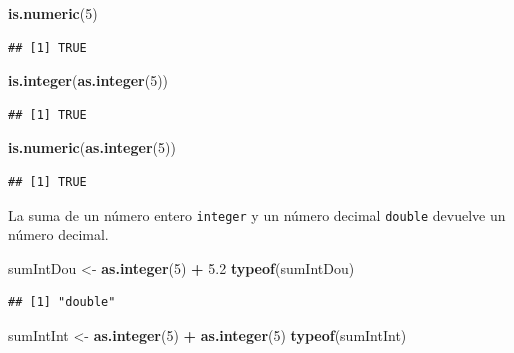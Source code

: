 \documentclass[]{book}
\newenvironment{Shaded}{\begin{snugshade}}{\end{snugshade}}
\newcommand{\KeywordTok}[1]{\textcolor[rgb]{0.13,0.29,0.53}{\textbf{#1}}}
\newcommand{\DecValTok}[1]{\textcolor[rgb]{0.00,0.00,0.81}{#1}}
\newcommand{\FloatTok}[1]{\textcolor[rgb]{0.00,0.00,0.81}{#1}}
\newcommand{\StringTok}[1]{\textcolor[rgb]{0.31,0.60,0.02}{#1}}
\newcommand{\OperatorTok}[1]{\textcolor[rgb]{0.81,0.36,0.00}{\textbf{#1}}}
\newcommand{\NormalTok}[1]{#1}
\begin{document}
\begin{Shaded}
\begin{Highlighting}[]
\KeywordTok{is.numeric}\NormalTok{(}\DecValTok{5}\NormalTok{)}
\end{Highlighting}
\end{Shaded}

\begin{verbatim}
## [1] TRUE
\end{verbatim}

\begin{Shaded}
\begin{Highlighting}[]
\KeywordTok{is.integer}\NormalTok{(}\KeywordTok{as.integer}\NormalTok{(}\DecValTok{5}\NormalTok{))}
\end{Highlighting}
\end{Shaded}

\begin{verbatim}
## [1] TRUE
\end{verbatim}

\begin{Shaded}
\begin{Highlighting}[]
\KeywordTok{is.numeric}\NormalTok{(}\KeywordTok{as.integer}\NormalTok{(}\DecValTok{5}\NormalTok{))}
\end{Highlighting}
\end{Shaded}

\begin{verbatim}
## [1] TRUE
\end{verbatim}

La suma de un número entero \texttt{integer} y un número decimal
\texttt{double} devuelve un número decimal.

\begin{Shaded}
\begin{Highlighting}[]
\NormalTok{sumIntDou <-}\StringTok{ }\KeywordTok{as.integer}\NormalTok{(}\DecValTok{5}\NormalTok{) }\OperatorTok{+}\StringTok{ }\FloatTok{5.2}
\KeywordTok{typeof}\NormalTok{(sumIntDou)}
\end{Highlighting}
\end{Shaded}

\begin{verbatim}
## [1] "double"
\end{verbatim}

\begin{Shaded}
\begin{Highlighting}[]
\NormalTok{sumIntInt <-}\StringTok{ }\KeywordTok{as.integer}\NormalTok{(}\DecValTok{5}\NormalTok{) }\OperatorTok{+}\StringTok{ }\KeywordTok{as.integer}\NormalTok{(}\DecValTok{5}\NormalTok{)}
\KeywordTok{typeof}\NormalTok{(sumIntInt)}
\end{Highlighting}
\end{Shaded}
\end{document}
